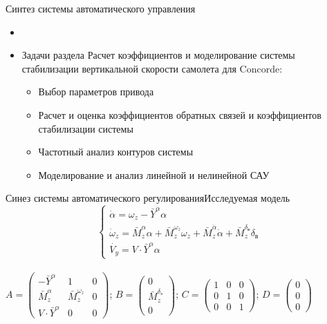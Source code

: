 \begin{frame}{Синтез системы автоматического управления}
    \begin{itemize}
        \item <+-> []
        \item <+-> []  \begin{block}{Задачи раздела}
                Расчет коэффициентов и моделирование системы стабилизации вертикальной скорости самолета для Concorde: 
            \begin{itemize}
                \item Выбор параметров привода 
                \item Расчет и оценка коэффициентов обратных связей и коэффициентов стабилизации системы
                \item Частотный анализ контуров системы 
                \item Моделирование и анализ линейной и нелинейной САУ
            \end{itemize}
        \end{block}
    \end{itemize}
\end{frame}

\begin{frame}{Синез системы автоматического регулирования}{Исследуемая модель} %
    $$ \begin{cases}
            \dot{\alpha}=\omega_z-\bar{Y}^{\alpha} \alpha \\
            \dot{\omega}_z=\bar{M}_z^{\alpha} \alpha+\bar{M}_z^{\omega_z} \omega_z +\bar{M}_z^{\dot{\alpha}} \dot{\alpha}+\bar{M}_z^{\delta_{\text{в}}} \delta_{\text{в}} \\
            \dot{V_y}=V \cdot \bar{Y}^{\alpha} \alpha
    \end{cases} $$ \\
    $A = \begin{pmatrix}
        -\bar{Y}^{\alpha} & 1 & 0\\ 
        \bar{M}_z^\alpha & \bar{M}_z^{\omega_z} & 0\\ 
         V \cdot \bar{Y}^\alpha& 0 & 0 
    \end{pmatrix}$;
    $B = \begin{pmatrix}
     0 \\ 
     \bar{M}_z^{\delta_{\text{э}}} \\ 
     0 
    \end{pmatrix}$;
    $C= \begin{pmatrix}
    1 & 0 & 0\\ 
    0 & 1 & 0\\ 
     0& 0 &1 
    \end{pmatrix}$;
    $D = \begin{pmatrix}
     0 \\ 
     0 \\ 
     0 
    \end{pmatrix}$
\end{frame}

